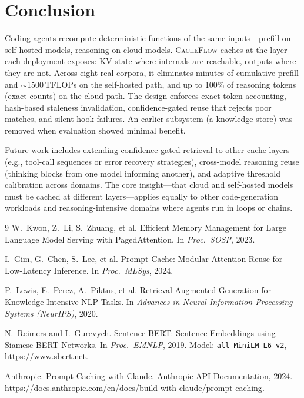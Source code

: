 \documentclass[10pt]{article}
\begin{document}
\section{Conclusion}
\label{sec:conclusion}

Coding agents recompute deterministic functions of the same inputs---prefill on
self-hosted models, reasoning on cloud models. \textsc{CacheFlow} caches at the
layer each deployment exposes: KV state where internals are reachable, outputs
where they are not. Across eight real corpora, it eliminates minutes of
cumulative prefill and $\sim$1500\,TFLOPs on the self-hosted path, and up to
100\% of reasoning tokens (exact counts) on the cloud path. The design enforces
exact token accounting, hash-based staleness invalidation, confidence-gated
reuse that rejects poor matches, and silent hook failures. An earlier subsystem
(a knowledge store) was removed when evaluation showed minimal benefit.

Future work includes extending confidence-gated retrieval to other cache layers
(e.g., tool-call sequences or error recovery strategies), cross-model reasoning
reuse (thinking blocks from one model informing another), and adaptive threshold
calibration across domains. The core insight---that cloud and self-hosted models
must be cached at different layers---applies equally to other code-generation
workloads and reasoning-intensive domains where agents run in loops or chains.

\begin{thebibliography}{9}
\small
{}
W.~Kwon, Z.~Li, S.~Zhuang, et al.
\newblock Efficient Memory Management for Large Language Model Serving with
PagedAttention.
\newblock In \emph{Proc.\ SOSP}, 2023.

I.~Gim, G.~Chen, S.~Lee, et al.
\newblock Prompt Cache: Modular Attention Reuse for Low-Latency Inference.
\newblock In \emph{Proc.\ MLSys}, 2024.

P.~Lewis, E.~Perez, A.~Piktus, et al.
\newblock Retrieval-Augmented Generation for Knowledge-Intensive NLP Tasks.
\newblock In \emph{Advances in Neural Information Processing Systems (NeurIPS)},
2020.

N.~Reimers and I.~Gurevych.
\newblock Sentence-BERT: Sentence Embeddings using Siamese BERT-Networks.
\newblock In \emph{Proc.\ EMNLP}, 2019.
\newblock Model: \texttt{all-MiniLM-L6-v2}, \url{https://www.sbert.net}.

Anthropic.
\newblock Prompt Caching with Claude.
\newblock Anthropic API Documentation, 2024.
\newblock \url{https://docs.anthropic.com/en/docs/build-with-claude/prompt-caching}.
\end{thebibliography}
\end{document}
